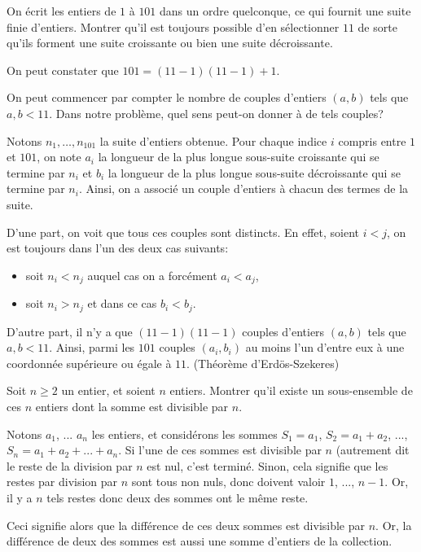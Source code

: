 \begin{exo}
On écrit les entiers de $1$ à $101$ dans un ordre quelconque, ce qui fournit une suite finie d'entiers. Montrer qu'il est toujours possible d'en sélectionner $11$ de sorte qu'ils forment une suite croissante ou bien une suite décroissante.
\begin{hint}
On peut constater que $101=\left(11-1\right)\left(11-1\right)+1$.
\end{hint}
\begin{hint2}
On peut commencer par compter le nombre de couples d'entiers $\left(a,b\right)$ tels que $a,b<11$. Dans notre probl\`eme, quel sens peut-on donner \`a de tels couples?
\end{hint2}
\begin{sol}
Notons $n_1, \ldots, n_101$ la suite d'entiers obtenue. Pour chaque indice $i$ compris entre $1$ et $101$, on note $a_i$ la longueur de la plus longue sous-suite croissante qui se termine par $n_i$ et $b_i$ la longueur de la plus longue sous-suite d\'ecroissante qui se termine par $n_i$. Ainsi, on a associ\'e un couple d'entiers \`a chacun des termes de la suite.\newline

D'une part, on voit que tous ces couples sont distincts. En effet, soient $i<j$, on est toujours dans l'un des deux cas suivants:
\begin{itemize}
\item soit $n_i<n_j$ auquel cas on a forc\'ement $a_i<a_j$,
\item soit $n_i>n_j$ et dans ce cas $b_i<b_j$.
\end{itemize}

D'autre part, il n'y a que $\left(11-1\right)\left(11-1\right)$ couples d'entiers $\left(a,b\right)$ tels que $a,b<11$. Ainsi, parmi les $101$ couples $\left(a_i,b_i\right)$ au moins l'un d'entre eux \`a une coordonn\'ee sup\'erieure ou \'egale \`a $11$. (Th\'eor\`eme d'Erd\"os-Szekeres)
\end{sol}
\end{exo}

\begin{exo}[Somme d'une sous-collection]
Soit $n\geq 2$ un entier, et soient $n$ entiers. Montrer qu'il existe un sous-ensemble de ces $n$ entiers dont la somme est divisible par $n$.
\begin{sol}
Notons $a_1$, ... $a_n$ les entiers, et considérons les sommes $S_1 = a_1$, $S_2 = a_1+a_2$, ..., $S_n = a_1+a_2+...+a_n$. Si l'une de ces sommes est divisible par $n$ (autrement dit le reste de la division par $n$ est nul, c'est terminé. Sinon, cela signifie que les restes par division par $n$ sont tous non nuls, donc doivent valoir $1$, ..., $n-1$. Or, il y a $n$ tels restes donc deux des sommes ont le même reste.

Ceci signifie alors que la différence de ces deux sommes est divisible par $n$. Or, la différence de deux des sommes est aussi une somme d'entiers de la collection.
\end{sol}
\end{exo}

